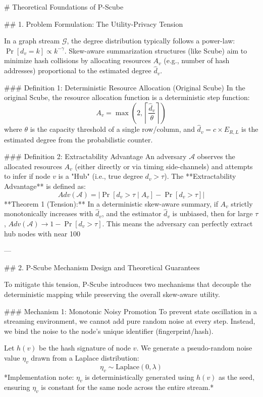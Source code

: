 # Theoretical Foundations of P-Scube

## 1. Problem Formulation: The Utility-Privacy Tension

In a graph stream $\mathcal{G}$, the degree distribution typically follows a power-law: $\Pr[d_v = k] \propto k^{-\gamma}$. 
Skew-aware summarization structures (like Scube) aim to minimize hash collisions by allocating resources $A_v$ (e.g., number of hash addresses) proportional to the estimated degree $\hat{d}_v$.

### Definition 1: Deterministic Resource Allocation (Original Scube)
In the original Scube, the resource allocation function is a deterministic step function:
$$ A_v = \max\left(2, \left\lceil \frac{\hat{d}_v}{\theta} \right\rceil \right) $$
where $\theta$ is the capacity threshold of a single row/column, and $\hat{d}_v = c \times E_{R,L}$ is the estimated degree from the probabilistic counter.

### Definition 2: Extractability Advantage
An adversary $\mathcal{A}$ observes the allocated resources $A_v$ (either directly or via timing side-channels) and attempts to infer if node $v$ is a "Hub" (i.e., true degree $d_v > \tau$). 
The **Extractability Advantage** is defined as:
$$ Adv(\mathcal{A}) = \left| \Pr[d_v > \tau \mid A_v] - \Pr[d_v > \tau] \right| $$
**Theorem 1 (Tension):** In a deterministic skew-aware summary, if $A_v$ strictly monotonically increases with $\hat{d}_v$, and the estimator $\hat{d}_v$ is unbiased, then for large $\tau$, $Adv(\mathcal{A}) \to 1 - \Pr[d_v > \tau]$. This means the adversary can perfectly extract hub nodes with near 100%

---

## 2. P-Scube Mechanism Design and Theoretical Guarantees

To mitigate this tension, P-Scube introduces two mechanisms that decouple the deterministic mapping while preserving the overall skew-aware utility.

### Mechanism 1: Monotonic Noisy Promotion
To prevent state oscillation in a streaming environment, we cannot add pure random noise at every step. Instead, we bind the noise to the node's unique identifier (fingerprint/hash).

Let $h(v)$ be the hash signature of node $v$. We generate a pseudo-random noise value $\eta_v$ drawn from a Laplace distribution:
$$ \eta_v \sim \text{Laplace}\left(0, \lambda \right) $$
*Implementation note: $\eta_v$ is deterministically generated using $h(v)$ as the seed, ensuring $\eta_v$ is constant for the same node across the entire stream.*

